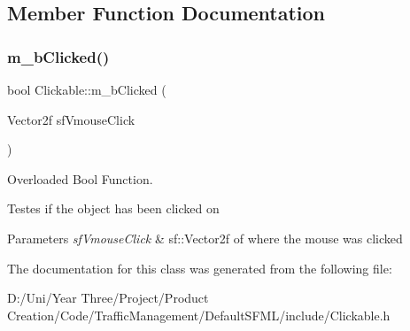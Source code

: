 \subsection{Member Function Documentation}
\hypertarget{class_clickable_a18e5ca51c572c9cb8a64dced28ccec09}{}\label{class_clickable_a18e5ca51c572c9cb8a64dced28ccec09} 
\subsubsection{\texorpdfstring{m\+\_\+b\+Clicked()}{m\_bClicked()}}
{\footnotesize\ttfamily bool Clickable\+::m\+\_\+b\+Clicked (\begin{DoxyParamCaption}\item[{Vector2f}]{sf\+Vmouse\+Click }\end{DoxyParamCaption})}



Overloaded Bool Function. 

Testes if the object has been clicked on


\begin{DoxyParams}{Parameters}
{\em sf\+Vmouse\+Click} & sf\+::\+Vector2f of where the mouse was clicked \\
\hline
\end{DoxyParams}


The documentation for this class was generated from the following file\+:\begin{DoxyCompactItemize}
\item 
D\+:/\+Uni/\+Year Three/\+Project/\+Product Creation/\+Code/\+Traffic\+Management/\+Default\+S\+F\+M\+L/include/Clickable.\+h\end{DoxyCompactItemize}
